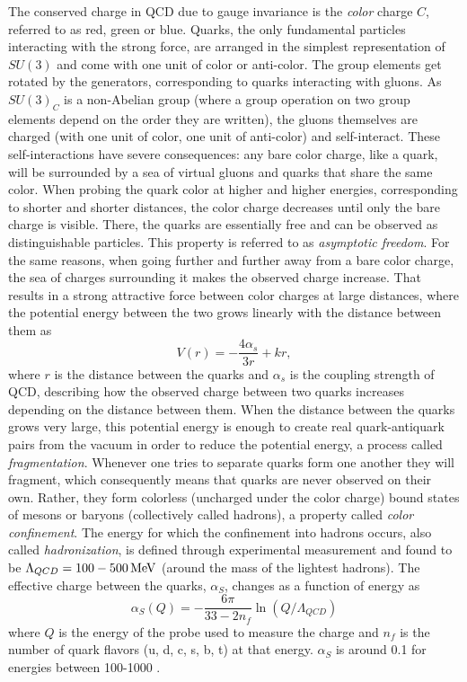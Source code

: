 The conserved charge in QCD due to gauge invariance is the \emph{color} charge $C$, referred to as red, green or blue. Quarks, the only fundamental particles interacting with the strong force, are arranged in the simplest representation of $SU(3)$ and come with one unit of color or anti-color. The group elements get rotated by the generators, corresponding to quarks interacting with gluons. As $SU(3)_C$ is a non-Abelian group (where a group operation on two group elements depend on the order they are written), the gluons themselves are charged (with one unit of color, one unit of anti-color) and self-interact. These self-interactions have severe consequences: any bare color charge, like a quark, will be surrounded by a sea of virtual gluons and quarks that share the same color. When probing the quark color at higher and higher energies, corresponding to shorter and shorter distances, the color charge decreases until only the bare charge is visible. There, the quarks are essentially free and can be observed as distinguishable particles. This property is referred to as \emph{asymptotic freedom}. For the same reasons, when going further and further away from a bare color charge, the sea of charges surrounding it makes the observed charge increase. That results in a strong attractive force between color charges at large distances, where the potential energy between the two grows linearly with the distance between them as
\begin{equation}
  V(r)=-\frac{4\alpha_s}{3r}+kr,
\end{equation} 
where $r$ is the distance between the quarks and $\alpha_s$ is the coupling strength of QCD, describing how the observed charge between two quarks increases depending on the distance between them. When the distance between the quarks grows very large, this potential energy is enough to create real quark-antiquark pairs from the vacuum in order to reduce the potential energy, a process called \emph{fragmentation}. Whenever one tries to separate quarks form one another they will fragment, which consequently means that quarks are never observed on their own. Rather, they form colorless (uncharged under the color charge) bound states of mesons or baryons (collectively called hadrons), a property called \emph{color confinement}. The energy for which the confinement into hadrons occurs, also called \emph{hadronization}, is defined through experimental measurement and found to be $\Lambda_{QCD}=100-500 \,\text{Me\hspace{-.08em}V}$ (around the mass of the lightest hadrons). The effective charge between the quarks, $\alpha_S$, changes as a function of energy as
 \begin{equation}
   \alpha_S(Q)=-\frac{6\pi}{33-2n_f}\ln(Q/\Lambda_{QCD})
 \end{equation}
where $Q$ is the energy of the probe used to measure the charge and $n_f$ is the number of quark flavors (u, d, c, s, b, t) at that energy. $\alpha_S$ is around 0.1 for energies between 100-1000 \GeV.

